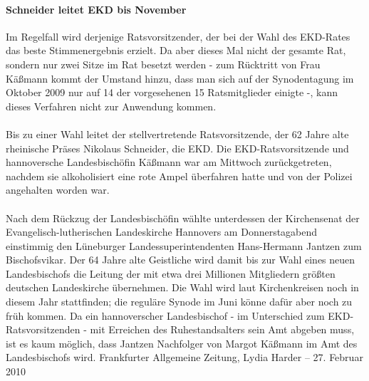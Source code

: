 \documentclass[a4paper,12pt,twoside]{scrbook}
\begin{document}
\paragraph{Schneider leitet EKD bis November}
Im Regelfall wird derjenige Ratsvorsitzender, der bei der Wahl des EKD-Rates das beste Stimmenergebnis erzielt. Da aber dieses Mal nicht der gesamte Rat, sondern nur zwei Sitze im Rat besetzt werden - zum Rücktritt von Frau Käßmann kommt der Umstand hinzu, dass man sich auf der Synodentagung im Oktober 2009 nur auf 14 der vorgesehenen 15 Ratsmitglieder einigte -, kann dieses Verfahren nicht zur Anwendung kommen.
\\\\
Bis zu einer Wahl leitet der stellvertretende Ratsvorsitzende, der 62 Jahre alte rheinische Präses Nikolaus Schneider, die EKD. Die EKD-Ratsvorsitzende und hannoversche Landesbischöfin Käßmann war am Mittwoch zurückgetreten, nachdem sie alkoholisiert eine rote Ampel überfahren hatte und von der Polizei angehalten worden war.
\\\\
Nach dem Rückzug der Landesbischöfin wählte unterdessen der Kirchensenat der Evangelisch-lutherischen Landeskirche Hannovers am Donnerstagabend einstimmig den Lüneburger Landessuperintendenten Hans-Hermann Jantzen zum Bischofsvikar. Der 64 Jahre alte Geistliche wird damit bis zur Wahl eines neuen Landesbischofs die Leitung der mit etwa drei Millionen Mitgliedern größten deutschen Landeskirche übernehmen. Die Wahl wird laut Kirchenkreisen noch in diesem Jahr stattfinden; die reguläre Synode im Juni könne dafür aber noch zu früh kommen. Da ein hannoverscher Landesbischof - im Unterschied zum EKD-Ratsvorsitzenden - mit Erreichen des Ruhestandsalters sein Amt abgeben muss, ist es kaum möglich, dass Jantzen Nachfolger von Margot Käßmann im Amt des Landesbischofs wird.
\newpage
Frankfurter Allgemeine Zeitung, Lydia Harder \hfill -- \hfill 27. Februar 2010
\end{document}
